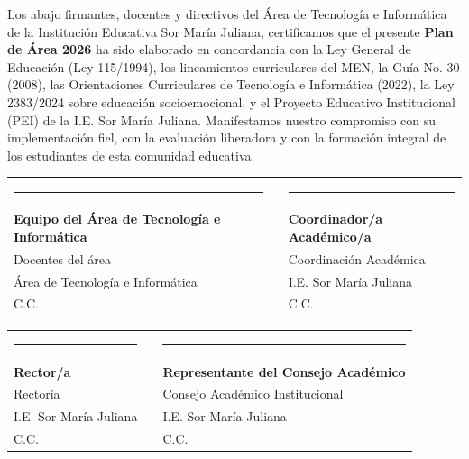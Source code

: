 \documentclass[12pt, a4paper]{article}
\begin{document}
\vspace{0.8cm}

Los abajo firmantes, docentes y directivos del Área de Tecnología e Informática
de la Institución Educativa Sor María Juliana, certificamos que el presente
\textbf{Plan de Área 2026} ha sido elaborado en concordancia con la Ley General
de Educación (Ley 115/1994), los lineamientos curriculares del MEN, la Guía
No. 30 (2008), las Orientaciones Curriculares de Tecnología e Informática (2022),
la Ley 2383/2024 sobre educación socioemocional, y el Proyecto Educativo
Institucional (PEI) de la I.E. Sor María Juliana. Manifestamos nuestro compromiso
con su implementación fiel, con la evaluación liberadora y con la formación
integral de los estudiantes de esta comunidad educativa.

\vspace{1.8cm}

\begin{center}
\begin{tabular}{M{5.5cm} M{2cm} M{5.5cm}}
\rule{5.5cm}{0.5pt} & & \rule{5.5cm}{0.5pt} \\[0.3cm]
{\small\textbf{Equipo del Área de Tecnología e Informática}} & &
{\small\textbf{Coordinador/a Académico/a}} \\[0.1cm]
{\small Docentes del área} & &
{\small Coordinación Académica} \\[0.1cm]
{\small Área de Tecnología e Informática} & &
{\small I.E. Sor María Juliana} \\[0.1cm]
{\small C.C. \underline{\hspace{4cm}}} & &
{\small C.C. \underline{\hspace{4cm}}} \\
\end{tabular}
\end{center}

\vspace{1.8cm}

\begin{center}
\begin{tabular}{M{5.5cm} M{2cm} M{5.5cm}}
\rule{5.5cm}{0.5pt} & & \rule{5.5cm}{0.5pt} \\[0.3cm]
{\small\textbf{Rector/a}} & &
{\small\textbf{Representante del Consejo Académico}} \\[0.1cm]
{\small Rectoría} & &
{\small Consejo Académico Institucional} \\[0.1cm]
{\small I.E. Sor María Juliana} & &
{\small I.E. Sor María Juliana} \\[0.1cm]
{\small C.C. \underline{\hspace{4cm}}} & &
{\small C.C. \underline{\hspace{4cm}}} \\
\end{tabular}
\end{center}
\end{document}
